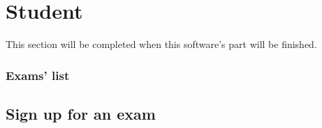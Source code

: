 \documentclass[ManualeUtente.tex]{subfiles}
\begin{document}
\chapter{Student}
This section will be completed when this software's part will be finished.
\subsection{Exams' list}
\section{Sign up for an exam}
\end{document}
